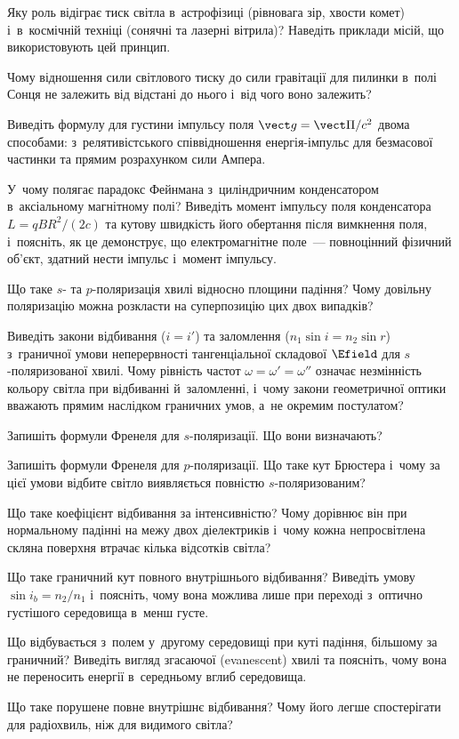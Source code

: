 \begin{Questions}
\begin{quizlist}
		\item Яку роль відіграє тиск світла в~астрофізиці (рівновага зір, хвости комет) і~в~космічній техніці (сонячні та лазерні вітрила)? Наведіть приклади місій, що використовують цей принцип.
		\item Чому відношення сили світлового тиску до сили гравітації для пилинки в~полі Сонця не залежить від відстані до нього і~від чого воно залежить?
		\item Виведіть формулу для густини імпульсу поля $\vect g = \vect\Pi/c^2$ двома способами: з~релятивістського співвідношення енергія-імпульс для безмасової частинки та прямим розрахунком сили Ампера.
		\item У~чому полягає парадокс Фейнмана з~циліндричним конденсатором в~аксіальному магнітному полі? Виведіть момент імпульсу поля конденсатора $L=qBR^2/(2c)$ та кутову швидкість його обертання після вимкнення поля, і~поясніть, як це демонструє, що електромагнітне поле~--- повноцінний фізичний об'єкт, здатний нести імпульс і~момент імпульсу.
		\item Що таке $s$- та $p$-поляризація хвилі відносно площини падіння? Чому довільну поляризацію можна розкласти на суперпозицію цих двох випадків?
		\item Виведіть закони відбивання ($i=i'$) та заломлення ($n_1\sin i = n_2\sin r$) з~граничної умови неперервності тангенціальної складової $\Efield$ для $s$-поляризованої хвилі. Чому рівність частот $\omega=\omega'=\omega''$ означає незмінність кольору світла при відбиванні й~заломленні, і~чому закони геометричної оптики вважають прямим наслідком граничних умов, а~не окремим постулатом?
		\item Запишіть формули Френеля для $s$-поляризації. Що вони визначають?
		\item Запишіть формули Френеля для $p$-поляризації. Що таке кут Брюстера і~чому за цієї умови відбите світло виявляється повністю $s$-поляризованим?
		\item Що таке коефіцієнт відбивання за інтенсивністю? Чому дорівнює він при нормальному падінні на межу двох діелектриків і~чому кожна непросвітлена скляна поверхня втрачає кілька відсотків світла?
		\item Що таке граничний кут повного внутрішнього відбивання? Виведіть умову $\sin i_b = n_2/n_1$ і~поясніть, чому вона можлива лише при переході з~оптично густішого середовища в~менш густе.
		\item Що відбувається з~полем у~другому середовищі при куті падіння, більшому за граничний? Виведіть вигляд згасаючої (evanescent) хвилі та поясніть, чому вона не переносить енергії в~середньому вглиб середовища.
		\item Що таке порушене повне внутрішнє відбивання? Чому його легше спостерігати для радіохвиль, ніж для видимого світла?
	\end{quizlist}
\end{Questions}

